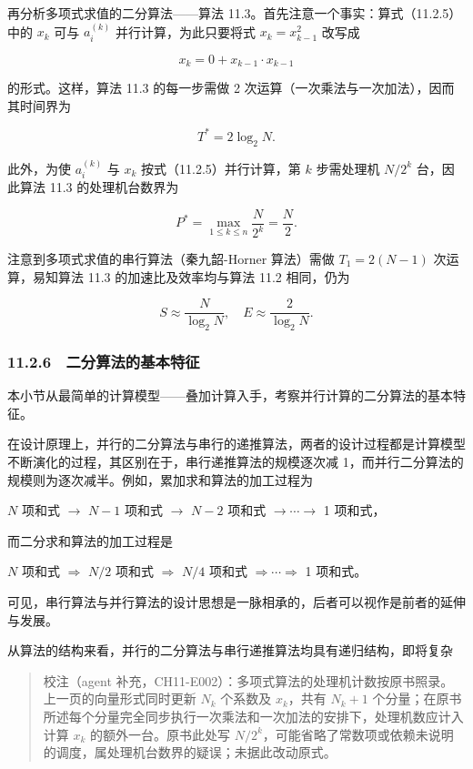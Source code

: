 \documentclass[
  10pt,
  fontset=fandol]{ctexart}
\begin{document}
再分析多项式求值的二分算法------算法 11.3。首先注意一个事实：算式（11.2.5）中的 \(x_k\) 可与 \(a_i^{(k)}\) 并行计算，为此只要将式 \(x_k=x_{k-1}^2\) 改写成

\[
x_k=0+x_{k-1}\cdot x_{k-1}
\]

的形式。这样，算法 11.3 的每一步需做 2 次运算（一次乘法与一次加法），因而其时间界为

\[
T^*=2\log_2 N.
\]

此外，为使 \(a_i^{(k)}\) 与 \(x_k\) 按式（11.2.5）并行计算，第 \(k\) 步需处理机 \(N/2^k\) 台，因此算法 11.3 的处理机台数界为

\[
P^*=\max_{1\le k\le n}\frac{N}{2^k}=\frac{N}{2}.
\]

注意到多项式求值的串行算法（秦九韶-Horner 算法）需做 \(T_1=2(N-1)\) 次运算，易知算法 11.3 的加速比及效率均与算法 11.2 相同，仍为

\[
S\approx\frac{N}{\log_2 N},\quad E\approx\frac{2}{\log_2 N}.
\]

\subsubsection{11.2.6　二分算法的基本特征}\label{ux4e8cux5206ux7b97ux6cd5ux7684ux57faux672cux7279ux5f81}

本小节从最简单的计算模型------叠加计算入手，考察并行计算的二分算法的基本特征。

在设计原理上，并行的二分算法与串行的递推算法，两者的设计过程都是计算模型不断演化的过程，其区别在于，串行递推算法的规模逐次减 1，而并行二分算法的规模则为逐次减半。例如，累加求和算法的加工过程为

\(N\) 项和式 \(\to\) \(N-1\) 项和式 \(\to\) \(N-2\) 项和式 \(\to\cdots\to\) 1 项和式，

而二分求和算法的加工过程是

\(N\) 项和式 \(\Rightarrow\) \(N/2\) 项和式 \(\Rightarrow\) \(N/4\) 项和式 \(\Rightarrow\cdots\Rightarrow\) 1 项和式。

可见，串行算法与并行算法的设计思想是一脉相承的，后者可以视作是前者的延伸与发展。

从算法的结构来看，并行的二分算法与串行递推算法均具有递归结构，即将复杂

\begin{quote}
校注（agent 补充，CH11-E002）：多项式算法的处理机计数按原书照录。上一页的向量形式同时更新 \(N_k\) 个系数及 \(x_k\)，共有 \(N_k+1\) 个分量；在原书所述每个分量完全同步执行一次乘法和一次加法的安排下，处理机数应计入计算 \(x_k\) 的额外一台。原书此处写 \(N/2^k\)，可能省略了常数项或依赖未说明的调度，属处理机台数界的疑误；未据此改动原式。
\end{quote}
\end{document}
